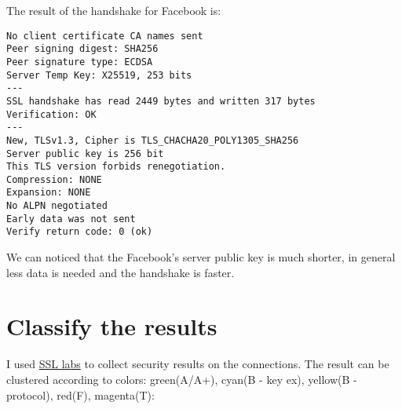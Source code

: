 \documentclass{article}
\begin{document}
The result of the handshake for Facebook is:

\begin{verbatim}
No client certificate CA names sent
Peer signing digest: SHA256
Peer signature type: ECDSA
Server Temp Key: X25519, 253 bits
---
SSL handshake has read 2449 bytes and written 317 bytes
Verification: OK
---
New, TLSv1.3, Cipher is TLS_CHACHA20_POLY1305_SHA256
Server public key is 256 bit
This TLS version forbids renegotiation.
Compression: NONE
Expansion: NONE
No ALPN negotiated
Early data was not sent
Verify return code: 0 (ok)
\end{verbatim}

We can noticed that the Facebook's server public key is much shorter,
in general less data is needed and the handshake is faster.

\section{Classify the results}

I used \href{https://www.ssllabs.com/ssltest/}{SSL labs} to collect security
results on the connections. The result can be clustered
according to colors: green(A/A+), cyan(B - key ex), yellow(B - protocol), red(F), magenta(T):
\end{document}

